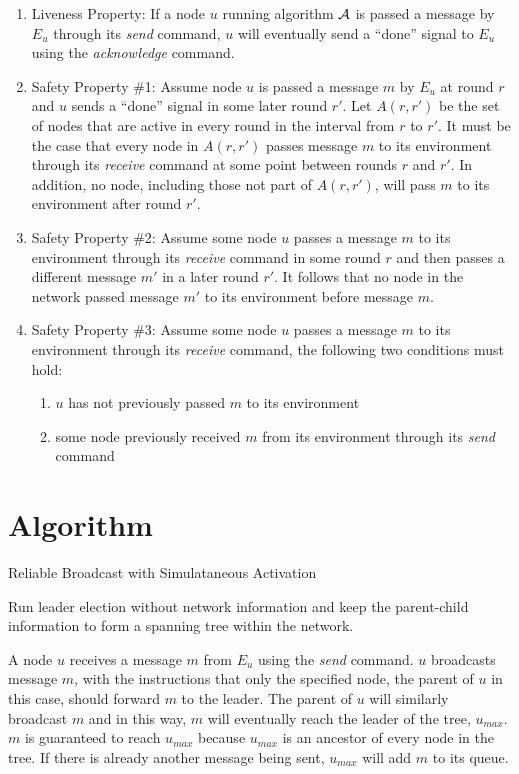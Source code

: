 \documentclass[english]{article}
\begin{document}
\begin {enumerate}
 
  \item Liveness Property: If a node $u$ running algorithm $\cal A$ is passed a message by $E_u$ through its \textit{send} command, $u$ will eventually send  a ``done'' signal to $E_u$ using the \textit{acknowledge} command.

  \item Safety Property \#1: Assume node $u$ is passed a message $m$ by $E_u$ at round $r$ and $u$ sends  a ``done'' signal in some later round $r'$. Let $A(r,r')$ be the set of nodes that are active in every round in the interval from $r$ to $r'$. It must be the case that every node in $A(r,r')$ passes message $m$ to its environment through its \textit{receive} command at some point between rounds $r$ and $r'$. In addition, no node, including those not part of $A(r,r')$, will pass $m$ to its environment after round $r'$. 

  \item Safety Property \#2: Assume some node $u$ passes a message $m$ to its environment through its \textit{receive} command in some round $r$ and then passes a different message $m'$ in a later round $r'$. It follows that no node in the network passed message $m'$ to its environment before message $m$. 

  \item Safety Property \#3: Assume some node $u$ passes a message $m$ to its environment through its \textit{receive} command, the following two conditions must hold:
  \begin {enumerate}
    \item $u$ has not previously passed $m$ to its environment
    \item some node previously received $m$ from its environment through its \textit{send} command
  \end{enumerate}

\end{enumerate}


\section{Algorithm}

Reliable Broadcast with Simulataneous Activation

Run leader election without network information and keep the parent-child information to form a spanning tree within the network.

A node $u$ receives a message $m$ from $E_u$ using the \textit{send} command. $u$ broadcasts message $m$, with the instructions that only the specified node, the parent of $u$ in this case, should forward $m$ to the leader. The parent of $u$ will similarly broadcast $m$ and in this way, $m$ will eventually reach the leader of the tree, $u_{max}$. $m$ is guaranteed to reach $u_{max}$ because $u_{max}$ is an ancestor of every node in the tree. If there is already another message being sent, $u_{max}$ will add $m$ to its queue. 
\end{document}
